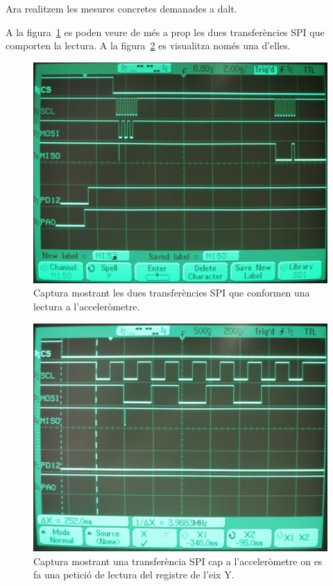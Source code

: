 Ara realitzem les mesures concretes demanades a dalt.

A la figura~\ref{fig:p4-analyzer-transfers}
es poden veure de més a prop les dues transferències SPI que comporten la lectura.
A la figura~\ref{fig:p4-analyzer-cmd} es visualitza només una d'elles.

\begin{figure}
  \begin{center}
    \includegraphics[width=1\columnwidth]{../photos/analyzer/interrupt-accel}
  \end{center}
  \caption{ \label{fig:p4-analyzer-transfers} Captura mostrant les dues transferències SPI que conformen una lectura a l'acceleròmetre. }
\end{figure}

\begin{figure}
  \begin{center}
    \includegraphics[width=1\columnwidth]{../photos/analyzer/interrupt-accel-cmd}
  \end{center}
  \caption{ \label{fig:p4-analyzer-cmd} Captura mostrant una transferència SPI cap a l'acceleròmetre on es fa una petició de lectura del registre de l'eix Y. }
\end{figure}

